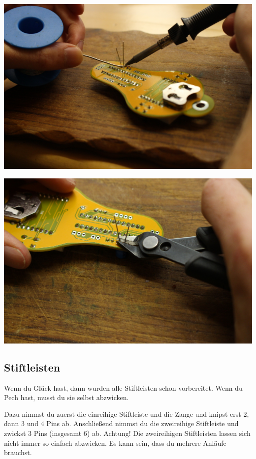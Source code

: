 \documentclass{article}
\begin{document}
\begin{minipage}[b]{0.5\textwidth}
	\includegraphics[width=\textwidth]{Bilder/IMG_5597.JPG}
\end{minipage}
\begin{minipage}[b]{0.5\textwidth}
	\includegraphics[width=\textwidth]{Bilder/IMG_5600.JPG}
\end{minipage}

\subsection{Stiftleisten}

Wenn du Glück hast, dann wurden alle Stiftleisten schon vorbereitet.
Wenn du Pech hast, musst du sie selbst abzwicken.

Dazu nimmst du zuerst die einreihige Stiftleiste und die Zange und knipst erst 2, dann 3 und 4 Pins ab. Anschließend nimmst du die zweireihige Stiftleiste und zwickst 3 Pins (insgesamt 6) ab. Achtung! Die zweireihigen Stiftleisten lassen sich nicht immer so einfach abzwicken. Es kann sein, dass du mehrere Anläufe brauchst.
\end{document}
